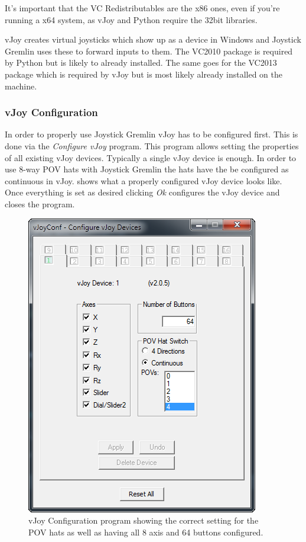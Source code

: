\documentclass[a4, 10pt]{article}
\newcommand{\JG}{Joystick Gremlin}
\begin{document}
It's important that the VC Redistributables are the x86 ones, even if
you're running a x64 system, as vJoy and Python require the 32bit
libraries.

vJoy creates virtual joysticks which show up as a device in Windows and
\JG{} uses these to forward inputs to them. The VC2010 package is
required by Python but is likely to already installed. The same goes for
the VC2013 package which is required by vJoy but is most likely already
installed on the machine.

\subsubsection{vJoy Configuration}

In order to properly use \JG{} vJoy has to be configured first. This is
done via the \emph{Configure vJoy} program. This program allows setting
the properties of all existing vJoy devices. Typically a single vJoy
device is enough. In order to use 8-way POV hats with \JG{} the hats
have the be configured as continuous in vJoy.  shows
what a properly configured vJoy device looks like. Once everything is
set as desired clicking \emph{Ok} configures the vJoy device and closes
the program.

\begin{figure}[bt]
    \centering

    \includegraphics[width=0.5\linewidth]{images/vjoy_configuration}
    \caption{vJoy Configuration program showing the correct setting for
        the POV hats as well as having all 8 axis and 64 buttons
        configured.}
    \label{fig:vjoy-config}
\end{figure}
\end{document}
